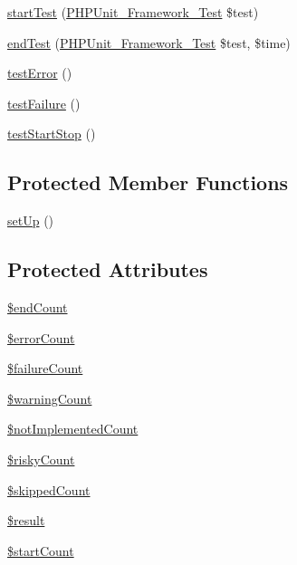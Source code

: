 \begin{DoxyCompactItemize}
\item 
\mbox{\hyperlink{class_framework___test_listener_test_a1a9bddc54f26bb3fb5c2ec9778ea5198}{start\+Test}} (\mbox{\hyperlink{interface_p_h_p_unit___framework___test}{P\+H\+P\+Unit\+\_\+\+Framework\+\_\+\+Test}} \$test)
\item 
\mbox{\hyperlink{class_framework___test_listener_test_a6de65eea8b294795cbc34c4c8cee8546}{end\+Test}} (\mbox{\hyperlink{interface_p_h_p_unit___framework___test}{P\+H\+P\+Unit\+\_\+\+Framework\+\_\+\+Test}} \$test, \$time)
\item 
\mbox{\hyperlink{class_framework___test_listener_test_a1376ff8646da407fae8c31d8fb67eb13}{test\+Error}} ()
\item 
\mbox{\hyperlink{class_framework___test_listener_test_ab4995640dd47ccdf177deb72344da9e0}{test\+Failure}} ()
\item 
\mbox{\hyperlink{class_framework___test_listener_test_a9307c9ef3dfc593baa9870563a8f81b1}{test\+Start\+Stop}} ()
\end{DoxyCompactItemize}
\subsection*{Protected Member Functions}
\begin{DoxyCompactItemize}
\item 
\mbox{\hyperlink{class_framework___test_listener_test_a0bc688732d2b3b162ffebaf7812e78da}{set\+Up}} ()
\end{DoxyCompactItemize}
\subsection*{Protected Attributes}
\begin{DoxyCompactItemize}
\item 
\mbox{\hyperlink{class_framework___test_listener_test_a53e7546b5e2334b01c474ca4603d28a1}{\$end\+Count}}
\item 
\mbox{\hyperlink{class_framework___test_listener_test_afaf496db54eb7b90b077d3ce427755bf}{\$error\+Count}}
\item 
\mbox{\hyperlink{class_framework___test_listener_test_a2b393e0bb8332b6e3ff162d1b67d8005}{\$failure\+Count}}
\item 
\mbox{\hyperlink{class_framework___test_listener_test_a1431473e4ac2d05d9808c6166bac32a2}{\$warning\+Count}}
\item 
\mbox{\hyperlink{class_framework___test_listener_test_a7637a64e18a203df0381b44cd8d1b221}{\$not\+Implemented\+Count}}
\item 
\mbox{\hyperlink{class_framework___test_listener_test_a1421c0c3edf52b05c6864a95ee9b3a4a}{\$risky\+Count}}
\item 
\mbox{\hyperlink{class_framework___test_listener_test_ac20367cdd998a5f0e2eea25e1068c913}{\$skipped\+Count}}
\item 
\mbox{\hyperlink{class_framework___test_listener_test_a112ef069ddc0454086e3d1e6d8d55d07}{\$result}}
\item 
\mbox{\hyperlink{class_framework___test_listener_test_aa5855f91aefd62f22bc5e26ee48aa91b}{\$start\+Count}}
\end{DoxyCompactItemize}
